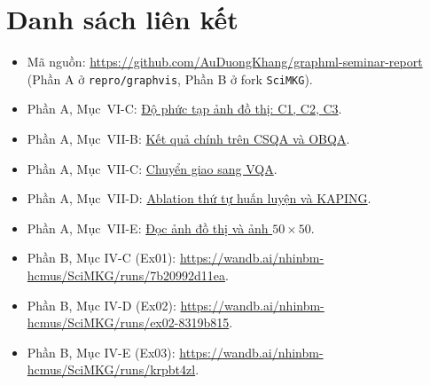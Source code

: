 \section{Danh sách liên kết}\label{app:links}
\begin{itemize}\footnotesize
\item Mã nguồn: \url{https://github.com/AuDuongKhang/graphml-seminar-report} (Phần A ở \texttt{repro/graphvis}, Phần B ở fork \texttt{SciMKG}).
\item Phần A, Mục~VI-C: \href{https://forge.coreweave.com/wandb/duongkhang2100-university-of-science-ho-chi-minh-/graphml-seminar-report/reports/VI-C-ph-c-t-p-nh-th-C1-C2-C3---VmlldzoxODE1MDkyMg?accessToken=k0p9ayvl7n6xu0nxh4m064aw1i7eic2rd5wk7fnzai39y1pqbugkmwx6sjnr9ree}{Độ phức tạp ảnh đồ thị: C1, C2, C3}.
\item Phần A, Mục~VII-B: \href{https://forge.coreweave.com/wandb/duongkhang2100-university-of-science-ho-chi-minh-/graphml-seminar-report/reports/VII-B-K-t-qu-ch-nh-CSQA-OBQA---VmlldzoxODE1MDg3OQ?accessToken=utsf3q1euuqow02lp5ngsc484lljatsdpjw3ifo7gms5oy3gkwpyqju4vxlt6hmh}{Kết quả chính trên CSQA và OBQA}.
\item Phần A, Mục~VII-C: \href{https://forge.coreweave.com/wandb/duongkhang2100-university-of-science-ho-chi-minh-/graphml-seminar-report/reports/VII-C-Chuy-n-giao-sang-VQA-G2-G3---VmlldzoxODE1MDk3NA?accessToken=rr16q2af8ndn3u4e9xfn6tt5jotymrtmnkrfgzq9t3xqzmzkfzw1tt9qowp5wmix}{Chuyển giao sang VQA}.
\item Phần A, Mục~VII-D: \href{https://forge.coreweave.com/wandb/duongkhang2100-university-of-science-ho-chi-minh-/graphml-seminar-report/reports/VII-D-Ablation-th-t-hu-n-luy-n-v-KAPING--VmlldzoxODE1MDkxMw?accessToken=x21tw6skdy91vcuqe2zj7ii3phsovsxuzqjmffp97a2xt7jq4021rjvefbojeq81}{Ablation thứ tự huấn luyện và KAPING}.
\item Phần A, Mục~VII-E: \href{https://forge.coreweave.com/wandb/duongkhang2100-university-of-science-ho-chi-minh-/graphml-seminar-report/reports/VII-E-c-nh-th-v-nh-50x50-G6-G7---VmlldzoxODE1MDk0Nw?accessToken=u86b4vbk27j2qmbngzw095f0sapohlzdrql3htt2ix8qz06ae8azzbie3x4o1nig}{Đọc ảnh đồ thị và ảnh $50\times50$}.
\item Phần B, Mục IV-C (Ex01): \url{https://wandb.ai/nhinbm-hcmus/SciMKG/runs/7b20992d11ea}.
\item Phần B, Mục IV-D (Ex02): \url{https://wandb.ai/nhinbm-hcmus/SciMKG/runs/ex02-8319b815}.
\item Phần B, Mục IV-E (Ex03): \url{https://wandb.ai/nhinbm-hcmus/SciMKG/runs/krpbt4zl}.
\end{itemize}
